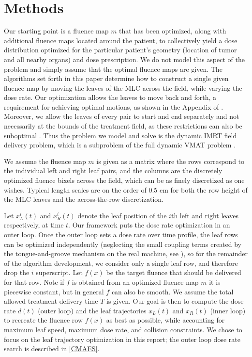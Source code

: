 \documentclass{iopart}
\begin{document}
\section{Methods}
\label{sec:model}

Our starting point is a fluence map $m$ that has been optimized, along with additional fluence maps located around the patient, to collectively yield a dose distribution optimized for the particular patient's geometry (location of tumor and all nearby organs) and dose prescription. We do not model this aspect of the problem and simply assume that the optimal fluence maps are given. The algorithms set forth in this paper determine how to construct a single given fluence map by moving the leaves of the MLC across the field, while varying the dose rate. Our optimization allows the leaves to move back and forth, a requirement for achieving optimal motions, as shown in the Appendix of \cite{balvertcraft}. Moreover, we allow the leaves of every pair to start and end separately and not necessarily at the bounds of the treatment field, as these restrictions can also be suboptimal \cite{thesisKvA}. Thus the problem we model and solve is the dynamic IMRT field delivery problem, which is a subproblem of the full dynamic VMAT problem \cite{vmerge}.

We assume the fluence map $m$ is given as a matrix where the rows correspond to the individual left and right leaf pairs, and the columns are the discretely optimized fluence bixels across the field, which can be as finely discretized as one wishes. Typical length scales are on the order of 0.5 cm for both the row height of the MLC leaves and the across-the-row discretization.

Let $x^i_L(t)$ and $x^i_R(t)$ denote the leaf position of the $i$th left and right leaves respectively, at time $t$. Our framework puts the dose rate optimization in an outer loop. Once the outer loop sets a dose rate over time profile, the leaf rows can be optimized independently (neglecting the small coupling terms created by the tongue-and-groove mechanism on the real machine, see \cite{unkvmatreview}), so for the remainder of the algorithm development, we consider only a single leaf row, and therefore drop the $i$ superscript. Let $f(x)$ be the target fluence that should be delivered for that row. Note if $f$ is obtained from an optimized fluence map $m$ it is piecewise constant, but in general $f$ can also be smooth. We assume the total allowed treatment delivery time $T$ is given. Our goal is then to compute the dose rate $d(t)$ (outer loop) and the leaf trajectories $x_L(t)$ and $x_R(t)$ (inner loop) to recreate the fluence row $f(x)$ as best as possible, while accounting for maximum leaf speed, maximum dose rate, and collision constraints. We chose to focus on the leaf trajectory optimization in this report; the outer loop dose rate search is described in \ref{CMAES}.
\end{document}
